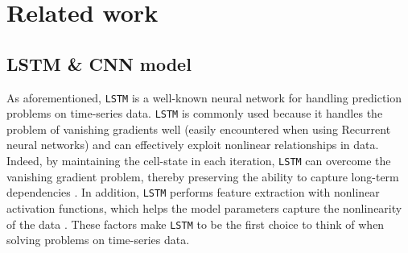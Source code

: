 \documentclass[aps,prb,groupedaddress,twocolumn,showpacs,dvipdfmx,superscriptaddress,pdftex]{revtex4-2}
\begin{document}
\section{Related work}
\label{sec.relatedWork}

\subsection{LSTM \& CNN model}


As aforementioned, \verb|LSTM| is a well-known neural network for handling prediction problems on time-series data. \verb|LSTM| is commonly used because it handles the problem of vanishing gradients well (easily encountered when using Recurrent neural networks) and can effectively exploit nonlinear relationships in data. Indeed, by maintaining the cell-state in each iteration, \verb|LSTM| can overcome the vanishing gradient problem, thereby preserving the ability to capture long-term dependencies \cite{cheng2018applied}. In addition, \verb|LSTM| performs feature extraction with nonlinear activation functions, which helps the model parameters capture the nonlinearity of the data \cite{he2016exploiting}. These factors make \verb|LSTM| to be the first choice to think of when solving problems on time-series data.

\vspace{2mm}

\end{document}
